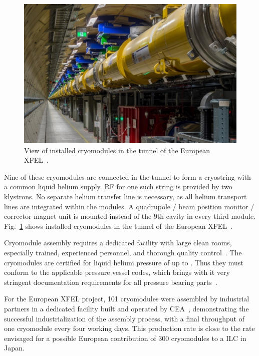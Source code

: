 \begin{figure}[htbp]
   \includegraphics[width=\hsize]{chapters/figures/srf17-moxa02-fig1}
\caption{View of installed cryomodules in the tunnel of the European XFEL~\cite{Reschke:2018ywk}.
}
\label{fig:xfel-tunnel}
\end{figure}


Nine of these cryomodules are connected in the tunnel to form a cryostring with a common liquid helium supply.  RF for one such string is provided by two klystrons.
No separate helium transfer line is necessary, as all helium transport lines are integrated within the modules.  A  quadrupole / beam position monitor / corrector magnet unit  is mounted instead of the 9th cavity in every third module.
Fig.~\ref{fig:xfel-tunnel} shows installed cryomodules in the tunnel of the European XFEL~\cite{Reschke:2018ywk}.

Cryomodule assembly requires a dedicated facility with large clean rooms, especially trained, experienced personnel, and thorough quality control~\cite{Berry:2017gpt}.
The cryomodules are certified for liquid helium pressure of up to .  Thus they must  conform to the applicable pressure vessel codes, which brings with it very stringent documentation requirements for all pressure bearing parts~\cite{Peterson:2011zz}.

For the European XFEL project, 101 cryomodules were assembled by industrial partners in a dedicated facility built and operated by CEA~\cite{Weise:2014zqa,Berry:2017gpt}, demonstrating the successful industrialization of the assembly process, with a final throughput of one cryomodule every four working days.
This production rate is close to the rate envisaged for a possible European contribution of 300 cryomodules to a  ILC in Japan.

